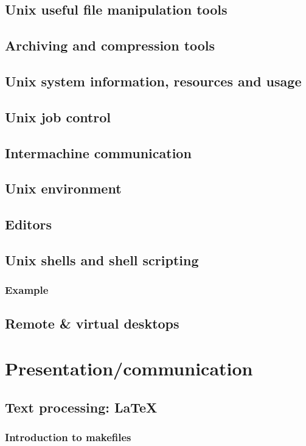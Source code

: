 \documentclass[12pt]{article}
\begin{document}
\subsection{Unix useful file manipulation tools}
\subsection{Archiving and compression tools}
\subsection{Unix system information, resources and usage}
\subsection{Unix job control}
\subsection{Intermachine communication}
\subsection{Unix environment}
\subsection{Editors}
\subsection{Unix shells and shell scripting}
\subsubsection{Example}
\subsection{Remote \& virtual desktops}

\section{Presentation/communication}
\subsection{Text processing: LaTeX}
\subsubsection{Introduction to makefiles}
\end{document}
